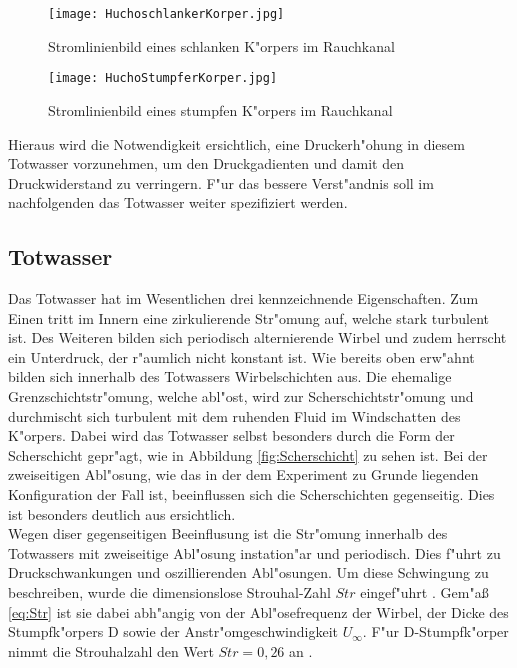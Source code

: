 \begin{figure}[h]
	\centering
	\texttt{[image: HuchoschlankerKorper.jpg]}
	\caption{Stromlinienbild eines schlanken K"orpers im Rauchkanal \cite{Hucho.2011}}
	\label{fig:HuchoSchlank}
\end{figure}

\begin{figure}[h]
	\centering
	\texttt{[image: HuchoStumpferKorper.jpg]}
	\caption{Stromlinienbild eines stumpfen K"orpers im Rauchkanal \cite{Hucho.2011}}
	\label{fig:HuchoStumpf}
\end{figure}

Hieraus wird die Notwendigkeit ersichtlich, eine Druckerh"ohung in diesem Totwasser vorzunehmen, um den Druckgadienten und damit den Druckwiderstand zu verringern. F"ur das bessere Verst"andnis soll im nachfolgenden das Totwasser weiter spezifiziert werden.

\subsection{Totwasser}
\label{sec:Totwasser}
Das Totwasser hat im Wesentlichen drei kennzeichnende Eigenschaften. Zum Einen tritt im Innern eine zirkulierende Str"omung auf, welche stark turbulent ist. Des Weiteren bilden sich periodisch alternierende Wirbel und zudem herrscht ein Unterdruck, der r"aumlich nicht konstant ist. 
Wie bereits oben erw"ahnt bilden sich innerhalb des Totwassers Wirbelschichten aus. Die ehemalige Grenzschichtstr"omung, welche abl"ost, wird zur Scherschichtstr"omung und durchmischt sich turbulent mit dem ruhenden Fluid im Windschatten des K"orpers. Dabei wird das Totwasser selbst besonders durch die Form der Scherschicht gepr"agt, wie in Abbildung \ref{fig:Scherschicht} zu sehen ist. Bei der zweiseitigen Abl"osung, wie das in der dem Experiment zu Grunde liegenden Konfiguration der Fall ist, beeinflussen sich die Scherschichten gegenseitig. Dies ist besonders deutlich aus  ersichtlich.\\
Wegen diser gegenseitigen Beeinflusung ist die Str"omung innerhalb des Totwassers mit zweiseitige Abl"osung instation"ar und periodisch. Dies f"uhrt zu Druckschwankungen und oszillierenden Abl"osungen. Um diese Schwingung zu beschreiben, wurde die dimensionslose Strouhal-Zahl $Str$ eingef"uhrt \cite{Leder.1992}. Gem"a\ss{} \ref{eq:Str} ist sie dabei abh"angig von der Abl"osefrequenz der Wirbel, der Dicke des Stumpfk"orpers D sowie der Anstr"omgeschwindigkeit $U_{\infty}$. F"ur D-Stumpfk"orper nimmt die Strouhalzahl den Wert $Str = 0,26$ an \cite{Pastoor.2008}.

